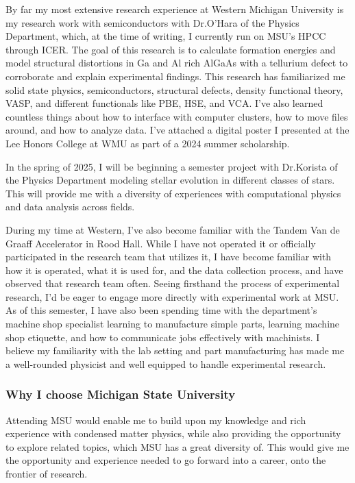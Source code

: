 \documentclass[11pt]{article}
\newcommand{\school}{Michigan State University}
\newcommand{\schoolabbr}{MSU}
\begin{document}
By far my most extensive research experience at Western Michigan University is my research work with semiconductors with Dr.\@ O'Hara of the Physics Department, which, at the time of writing, I currently run on MSU's HPCC through ICER. The goal of this research is to calculate formation energies and model structural distortions in Ga and Al rich AlGaAs with a tellurium defect to corroborate and explain experimental findings. This research has familiarized me solid state physics, semiconductors, structural defects, density functional theory, VASP, and different functionals like PBE, HSE, and VCA. I've also learned countless things about how to interface with computer clusters, how to move files around, and how to analyze data. I've attached a digital poster I presented at the Lee Honors College at WMU as part of a 2024 summer scholarship.

In the spring of 2025, I will be beginning a semester project with Dr.\@ Korista of the Physics Department modeling stellar evolution in different classes of stars. This will provide me with a diversity of experiences with computational physics and data analysis across fields.

During my time at Western, I've also become familiar with the Tandem Van de Graaff Accelerator in Rood Hall. While I have not operated it or officially participated in the research team that utilizes it, I have become familiar with how it is operated, what it is used for, and the data collection process, and have observed that research team often. Seeing firsthand the process of experimental research, I'd be eager to engage more directly with experimental work at \schoolabbr{}. As of this semester, I have also been spending time with the department's machine shop specialist learning to manufacture simple parts, learning machine shop etiquette, and how to communicate jobs effectively with machinists. I believe my familiarity with the lab setting and part manufacturing has made me a well-rounded physicist and well equipped to handle experimental research.

\subsubsection*{Why I choose \school{}}
Attending \schoolabbr{} would enable me to build upon my knowledge and rich experience with condensed matter physics, while also providing the opportunity to explore related topics, which \schoolabbr{} has a great diversity of. This would give me the opportunity and experience needed to go forward into a career, onto the frontier of research.
\end{document}
